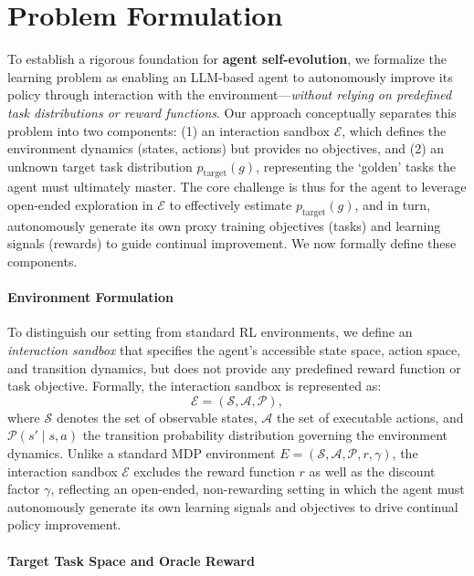 \section{Problem Formulation}
\label{sec:formulation}

To establish a rigorous foundation for \textbf{agent self-evolution}, we formalize the learning problem as enabling an LLM-based agent to autonomously improve its policy through interaction with the environment---\textit{without relying on predefined task distributions or reward functions}. 
Our approach conceptually separates this problem into two components: (1) an interaction sandbox $\mathcal{E}$, which defines the environment dynamics (states, actions) but provides no objectives, and (2) an unknown target task distribution $p_{\text{target}}(g)$, representing the `golden' tasks the agent must ultimately master. The core challenge is thus for the agent to leverage open-ended exploration in $\mathcal{E}$ to effectively estimate $p_{\text{target}}(g)$, and in turn, autonomously generate its own proxy training objectives (tasks) and learning signals (rewards) to guide continual improvement. We now formally define these components.


\paragraph{Environment Formulation}
{
To distinguish our setting from standard RL environments, 
we define an \textit{interaction sandbox} that specifies the agent’s accessible state space, 
action space, and transition dynamics, but does not provide any predefined reward function or task objective. 
Formally, the interaction sandbox is represented as:
\begin{equation}
\label{eq:interaction_world}
\mathcal{E} = (\mathcal{S}, \mathcal{A}, \mathcal{P}),
\end{equation}
where $\mathcal{S}$ denotes the set of observable states, 
$\mathcal{A}$ the set of executable actions, 
and $\mathcal{P}(s' \mid s, a)$ the transition probability distribution governing the environment dynamics. 
Unlike a standard MDP environment ${E} = (\mathcal{S}, \mathcal{A}, \mathcal{P}, r, \gamma)$, 
the interaction sandbox $\mathcal{E}$ excludes the reward function $r$ as well as the discount factor $\gamma$, 
reflecting an open-ended, non-rewarding setting in which the agent must autonomously generate 
its own learning signals and objectives to drive continual policy improvement.}

\paragraph{Target Task Space and Oracle Reward}


